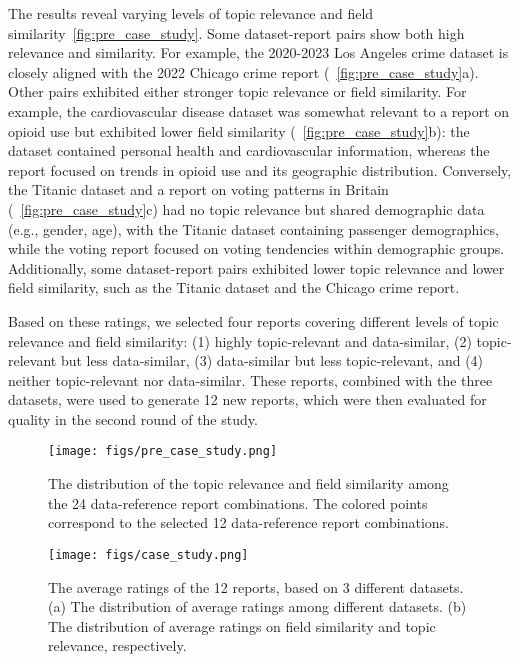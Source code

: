 The results reveal varying levels of topic relevance and field similarity~\autoref{fig:pre_case_study}. 
Some dataset-report pairs show both high relevance and similarity. 
For example, the 2020-2023 Los Angeles crime dataset is closely aligned with the 2022 Chicago crime report (~\autoref{fig:pre_case_study}a). 
Other pairs exhibited either stronger topic relevance or field similarity. 
For example, the cardiovascular disease dataset was somewhat relevant to a report on opioid use but exhibited lower field similarity (~\autoref{fig:pre_case_study}b): the dataset contained personal health and cardiovascular information, whereas the report focused on trends in opioid use and its geographic distribution.
Conversely, the Titanic dataset and a report on voting patterns in Britain (~\autoref{fig:pre_case_study}c) had no topic relevance but shared demographic data (e.g., gender, age), with the Titanic dataset containing passenger demographics, while the voting report focused on voting tendencies within demographic groups. 
Additionally, some dataset-report pairs exhibited lower topic relevance and lower field similarity, such as the Titanic dataset and the Chicago crime report.



Based on these ratings, we selected four reports covering different levels of topic relevance and field similarity: (1) highly topic-relevant and data-similar, (2) topic-relevant but less data-similar, (3) data-similar but less topic-relevant, and (4) neither topic-relevant nor data-similar. 
These reports, combined with the three datasets, were used to generate 12 new reports, which were then evaluated for quality in the second round of the study.


\begin{figure*}[!htb] 
  \centering 
  \texttt{[image: figs/pre\_case\_study.png]}
  \caption{The distribution of the topic relevance and field similarity among the 24 data-reference report combinations. The colored points correspond to the selected 12 data-reference report combinations. }
  \label{fig:pre_case_study} 
\end{figure*}

\begin{figure*}[!htb] 
  \centering 
  \texttt{[image: figs/case\_study.png]}
  \caption{The average ratings of the 12 reports, based on 3 different datasets. (a) The distribution of average ratings among different datasets. (b) The distribution of average ratings on field similarity and topic relevance, respectively. 
  }
  \label{fig:case_study} 
\end{figure*}

